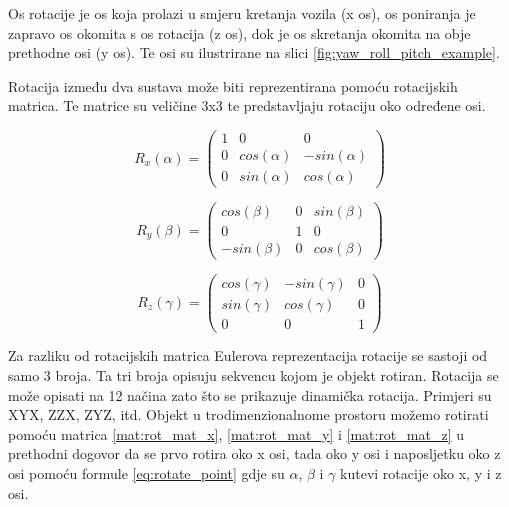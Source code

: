 Os rotacije je os koja prolazi u smjeru kretanja vozila (x os), os poniranja je zapravo os okomita s os rotacija (z os), dok je os skretanja okomita na obje prethodne osi (y os). Te osi su ilustrirane na slici \ref{fig:yaw_roll_pitch_example}.

Rotacija između dva sustava može biti reprezentirana pomoću rotacijskih matrica\cite{wiki:Rotation_matrix}. Te matrice su veličine 3x3 te predstavljaju rotaciju oko određene osi.

\begin{equation}
  R_{x}(\alpha) =
  \begin{pmatrix}
    1 & 0 & 0\\
    0 & cos(\alpha) & -sin(\alpha)\\
    0 & sin(\alpha) & cos(\alpha)
  \end{pmatrix}
  \label{mat:rot_mat_x}
\end{equation}

\begin{equation}
  R_{y}(\beta) =
  \begin{pmatrix}
    cos(\beta) & 0 & sin(\beta)\\
    0 & 1 & 0\\
    -sin(\beta) & 0 & cos(\beta)
  \end{pmatrix}
  \label{mat:rot_mat_y}
\end{equation}

\begin{equation}
  R_{z}(\gamma) =
  \begin{pmatrix}
    cos(\gamma) & -sin(\gamma) & 0\\
    sin(\gamma) & cos(\gamma) & 0\\
    0 & 0 & 1
  \end{pmatrix}
  \label{mat:rot_mat_z}
\end{equation}

Za razliku od rotacijskih matrica Eulerova reprezentacija rotacije se sastoji od samo 3 broja. Ta tri broja opisuju sekvencu kojom je objekt rotiran. Rotacija se može opisati na 12 načina zato što se prikazuje dinamička rotacija. Primjeri su XYX, ZZX, ZYZ, itd. Objekt u trodimenzionalnome prostoru možemo rotirati pomoću matrica \ref{mat:rot_mat_x}, \ref{mat:rot_mat_y} i \ref{mat:rot_mat_z} u prethodni dogovor da se prvo rotira oko x osi, tada oko y osi i naposljetku oko z osi pomoću formule \ref{eq:rotate_point} gdje su $\alpha$, $\beta$ i $\gamma$ kutevi rotacije oko x, y i z osi.

